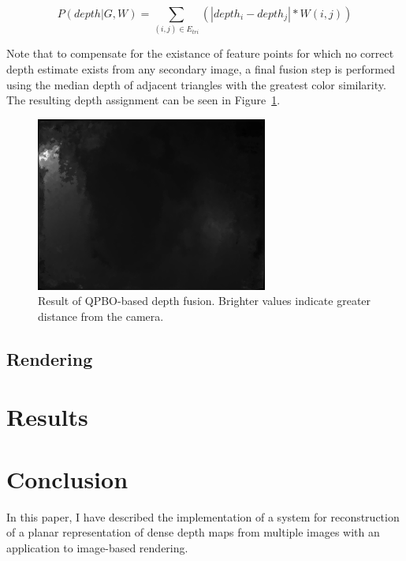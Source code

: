 \documentclass[conference]{acmsiggraph}
\begin{document}
\begin{equation}
    \label{eq:mrf}
    P(depth |G, W) = \sum_{(i, j) \in E_{tri}}
    \left(
        |depth_i - depth_j| * W(i, j)
    \right)
\end{equation}

Note that to compensate for the existance of feature points
for which no correct depth estimate exists from any
secondary image, a final fusion step is performed
using the median depth of adjacent triangles with
the greatest color similarity. The resulting depth
assignment can be seen in Figure~\ref{fig:initial_triangle_depth}.

\begin{figure}[ht]
  \centering
  \includegraphics[width=3in]{images/initial_triangle_depth}
  \caption{Result of QPBO-based depth fusion.  Brighter 
  values indicate greater distance from the camera.}
  \label{fig:initial_triangle_depth}
\end{figure}


\subsection{Rendering}


\section{Results}




\section{Conclusion}

In this paper, I have described the implementation of a system for
reconstruction of a planar representation of dense depth maps from multiple images
with an application to image-based rendering.




\end{document}
